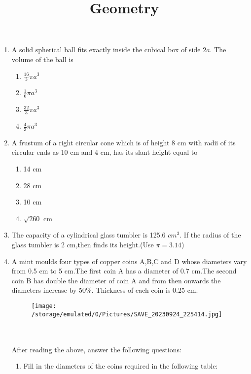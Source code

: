 \documentclass[12pt]{article}
\title{Geometry}
\begin{document}
\maketitle
\captionsetup[figure]{labelsep=space}
\begin{enumerate}

 \item A solid spherical ball fits exactly inside the cubical box of side 2$a$. The volume of the ball is
     \begin{enumerate}
         \item $\frac{16}{3}{\pi a^3}$
         \item $\frac{1}{6}{\pi a^3}$
         \item $\frac{32}{3}{\pi a^3}$
         \item $\frac{4}{3}{\pi a^3}$
     \end{enumerate}
  \item A frustum of a right circular cone which is of height 8 cm with radii of its circular ends as 10 cm and 4 cm, has its slant height equal to
       \begin{enumerate}
           \item 14 cm
           \item 28 cm
           \item 10 cm
           \item $\sqrt{260}$ cm
        \end{enumerate}
 \item The capacity of a cylindrical glass tumbler is 125.6 $cm^3$. If the radius of the glass tumbler is 2 cm,then finds its height.(Use $\pi=3.14$)
 \item A mint moulds four types of copper coins A,B,C and D whose diameters vary from 0.5 cm to 5 cm.The first coin A has a diameter of 0.7 cm.The second coin B has double the diameter of coin A and from then onwards the diameters increase by 50\%. Thickness of each coin is 0.25 cm.
     \begin{figure}[ht]
         \centering
         \texttt{[image: /storage/emulated/0/Pictures/SAVE\_20230924\_225414.jpg]}
         \caption{}
         \label{}
     \end{figure}
        \\ \\After reading the above, answer the following questions:
    \begin{enumerate}
     \item  Fill in the diameters of the coins required in the following table:
     

\end{enumerate}
\end{enumerate}
\end{document}
